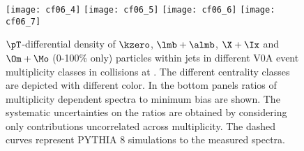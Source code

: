 \documentclass[ALICE,manyauthors]{cernphprep}
\begin{document}
\begin{figure}[!ht]
	\begin{center}
		\texttt{[image: cf06\_4]}
		\texttt{[image: cf06\_5]}
		\texttt{[image: cf06\_6]}
		\texttt{[image: cf06\_7]}
	\end{center}
	\caption{$\pT$-differential density of $\kzero$, $\lmb + \almb$, $\X + \Ix$ and $\Om + \Mo$ (0-100\% only) particles within jets in different V0A event multiplicity classes in \pPb collisions at \fivenn. The different centrality classes are depicted with different color. In the bottom panels ratios of multiplicity dependent spectra to minimum bias are shown. The systematic uncertainties on the ratios are obtained by considering only contributions uncorrelated across multiplicity.
	The dashed curves represent PYTHIA 8 simulations to the measured spectra.
	}
	\label{fig:pPbSpectwCent}
\end{figure}

\clearpage
\end{document}
